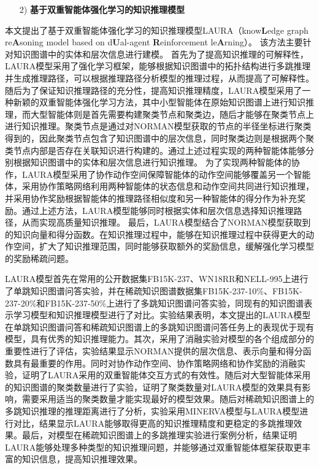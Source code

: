 \documentclass[algorithmlist, AutoFakeBold, AutoFakeSlant, figurelist, tablelist, nomlist, engineering, openany]{seuthesix} %
\begin{document}
\begin{itemize}[leftmargin=*]
  \item [2)]\textbf{基于双重智能体强化学习的知识推理模型}
\end{itemize}


本文提出了基于双重智能体强化学习的知识推理模型LAURA（know\textbf{L}edge graph re\textbf{A}soning model based on d\textbf{U}al-agent \textbf{R}einforcement le\textbf{A}rning）。
该方法主要针对知识图谱中的实体和层次信息进行建模。
首先为了提高知识推理的可解释性，LAURA模型采用了强化学习框架，能够根据知识图谱中的拓扑结构进行多跳推理并生成推理路径，可以根据推理路径分析模型的推理过程，从而提高了可解释性。
随后为了保证知识推理路径的充分性，提高知识推理精度，LAURA模型采用了一种新颖的双重智能体强化学习方法，其中小型智能体在原始知识图谱上进行知识推理，而大型智能体则是首先需要构建聚类节点和聚类边，随后才能够在聚类节点上进行知识推理。聚类节点是通过对NORMAN模型获取的节点的半径坐标进行聚类得到的，因此聚类节点包含了知识图谱中的层次信息，同时聚类边则是根据两个聚类节点内部是否存在关联知识进行构建的。通过上述过程实现的两种智能体能够分别根据知识图谱中的实体和层次信息进行知识推理。
为了实现两种智能体的协作，LAURA模型采用了协作动作空间保障智能体的动作空间能够覆盖另一个智能体，采用协作策略网络利用两种智能体的状态信息和动作空间共同进行知识推理，并采用协作奖励根据智能体的推理路径相似度和另一种智能体的得分作为补充奖励。通过上述方法，LAURA模型能够同时根据实体和层次信息选择知识推理路径，从而实现高质量知识推理。
最后，LAURA模型结合了NORMAN模型获取到的知识向量和得分函数。在知识推理过程中，能够在知识推理过程中获得更大的动作空间，扩大了知识推理范围，同时能够获取额外的奖励信息，缓解强化学习模型的奖励稀疏问题。

LAURA模型首先在常用的公开数据集FB15K-237、WN18RR和NELL-995上进行了单跳知识图谱问答实验，并在稀疏知识图谱数据集FB15K-237-10\%、FB15K-237-20\%和FB15K-237-50\%上进行了多跳知识图谱问答实验，同现有的知识图谱表示学习模型和知识推理模型进行了对比。实验结果表明，本文提出的LAURA模型在单跳知识图谱问答和稀疏知识图谱上的多跳知识图谱问答任务上的表现优于现有模型，具有优秀的知识推理能力。其次，采用了消融实验对模型的各个组成部分的重要性进行了评估，实验结果显示NORMAN提供的层次信息、表示向量和得分函数具有最重要的作用。同时对协作动作空间、协作策略网络和协作奖励的消融实验，证明了LAURA采用的双重智能体交互方式的有效性。随后对大型智能体采用的知识图谱的聚类数量进行了实验，证明了聚类数量对LAURA模型的效果具有影响，需要采用适当的聚类数量才能实现最好的模型效果。随后对稀疏知识图谱上的多跳知识推理的推理距离进行了分析，实验采用MINERVA模型与LAURA模型进行对比，结果显示LAURA能够取得更高的知识推理精度和更稳定的多跳推理效果。最后，对模型在稀疏知识图谱上的多跳推理实验进行案例分析，结果证明LAURA能够处理多种类型的知识推理问题，并能够通过双重智能体框架获取更丰富的知识信息，提高知识推理效果。
\end{document}
